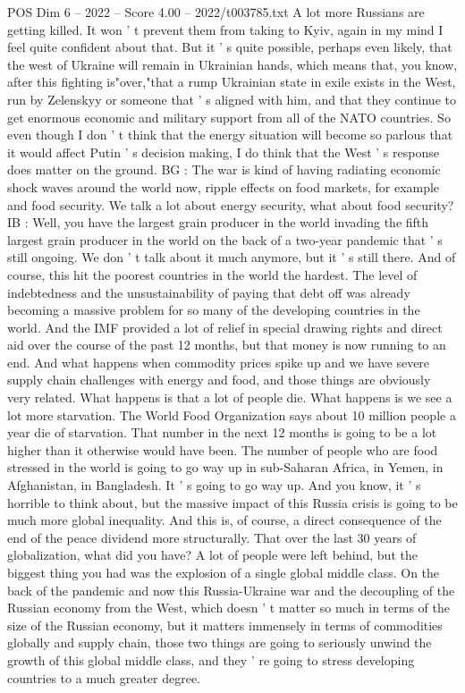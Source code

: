\begin{textsample}{POS Dim 6 – 2022 – Score 4.00 – 2022/t003785.txt}
A lot more Russians are getting killed.
It won ' t prevent them from taking to Kyiv, again in my mind I feel quite confident about that.
But it ' s quite possible, perhaps even likely, that the west of Ukraine will remain in Ukrainian hands, which means that, you know, after this fighting is"over,"that a rump Ukrainian state in exile exists in the West, run by Zelenskyy or someone that ' s aligned with him, and that they continue to get enormous economic and military support from all of the NATO countries.
So even though I don ' t think that the energy situation will become so parlous that it would affect Putin ' s decision making, I do think that the West ' s response does matter on the ground.
BG : The war is kind of having radiating economic shock waves around the world now, ripple effects on food markets, for example and food security.
We talk a lot about energy security, what about food security?
IB : Well, you have the largest grain producer in the world invading the fifth largest grain producer in the world on the back of a two-year pandemic that ' s still ongoing.
We don ' t talk about it much anymore, but it ' s still there.
And of course, this hit the poorest countries in the world the hardest.
The level of indebtedness and the unsustainability of paying that debt off was already becoming a massive problem for so many of the developing countries in the world.
And the IMF provided a lot of relief in special drawing rights and direct aid over the course of the past 12 months, but that money is now running to an end.
And what happens when commodity prices spike up and we have severe supply chain challenges with energy and food, and those things are obviously very related.
What happens is that a lot of people die.
What happens is we see a lot more starvation.
The World Food Organization says about 10 million people a year die of starvation.
That number in the next 12 months is going to be a lot higher than it otherwise would have been.
The number of people who are food stressed in the world is going to go way up in sub-Saharan Africa, in Yemen, in Afghanistan, in Bangladesh.
It ' s going to go way up.
And you know, it ' s horrible to think about, but the massive impact of this Russia crisis is going to be much more global inequality.
And this is, of course, a direct consequence of the end of the peace dividend more structurally.
That over the last 30 years of globalization, what did you have?
A lot of people were left behind, but the biggest thing you had was the explosion of a single global middle class.
On the back of the pandemic and now this Russia-Ukraine war and the decoupling of the Russian economy from the West, which doesn ' t matter so much in terms of the size of the Russian economy, but it matters immensely in terms of commodities globally and supply chain, those two things are going to seriously unwind the growth of this global middle class, and they ' re going to stress developing countries to a much greater degree.

\end{textsample}
